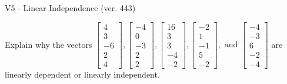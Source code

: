 \begin{exercise}
  \begin{exerciseTitle}V5 - Linear Independence (ver. 443)\end{exerciseTitle}
  \begin{exerciseStatement}
    Explain why the vectors \(\left[\begin{array}{r}
4 \\
3 \\
-6 \\
2 \\
4
\end{array}\right] , \left[\begin{array}{r}
-4 \\
0 \\
-3 \\
2 \\
2
\end{array}\right] , \left[\begin{array}{r}
16 \\
3 \\
3 \\
-4 \\
-2
\end{array}\right] , \left[\begin{array}{r}
-2 \\
1 \\
-1 \\
5 \\
-2
\end{array}\right] , \text{ and } \left[\begin{array}{r}
-4 \\
-3 \\
6 \\
-2 \\
-4
\end{array}\right]\) are linearly dependent or linearly independent.	



\end{exerciseStatement}
\end{exercise}
